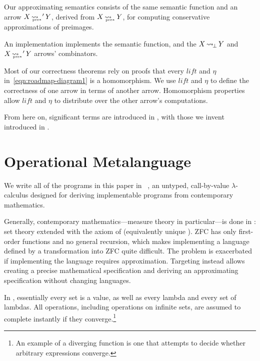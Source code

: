 \documentclass[preprint]{sigplanconf}
\newcommand{\arrow}{\rightsquigarrow}
\newcommand{\arrowlift}{\ensuremath{lift}}
\newcommand{\arrowtrans}{\ensuremath{\eta}}
\DeclareMathOperator{\botto}{\arrow_{\mspace{-3mu}\bot}}
\DeclareMathOperator{\ppreto}{\arrow_{\mspace{-19mu}_{\mathrm{pre*}}}}
\begin{document}
Our approximating semantics consists of the same semantic function and an arrow $X \ppreto' Y$, derived from $X \ppreto Y$, for computing conservative approximations of preimages.

An implementation implements the semantic function, and the $X \botto Y$ and $X \ppreto' Y$ arrows' combinators.

Most of our correctness theorems rely on proofs that every $\arrowlift$ and $\arrowtrans$ in~\eqref{eqn:roadmap-diagram1} is a homomorphism.
We use $\arrowlift$ and $\arrowtrans$ to define the correctness of one arrow in terms of another arrow.
Homomorphism properties allow $\arrowlift$ and $\arrowtrans$ to distribute over the other arrow's computations.

From here on, significant terms are introduced in , with those we invent introduced in .


\section{Operational Metalanguage}

We write all of the programs in this paper in \lzfclang~\cite{cit:toronto-2012flops-lzfc}, an untyped, call-by-value $\lambda$-calculus designed for deriving implementable programs from contemporary mathematics.

Generally, contemporary mathematics---measure theory in particular---is done in :  set theory extended with the axiom of  (equivalently unique ).
ZFC has only first-order functions and no general recursion, which makes implementing a language defined by a transformation into ZFC quite difficult.
The problem is exacerbated if implementing the language requires approximation.
Targeting \lzfclang instead allows creating a precise mathematical specification and deriving an approximating specification without changing languages.

In \lzfclang, essentially every set is a value, as well as every lambda and every set of lambdas.
All operations, including operations on infinite sets, are assumed to complete instantly if they converge.\footnote{An example of a diverging \lzfclang function is one that attempts to decide whether arbitrary \lzfclang expressions converge.}
\end{document}
